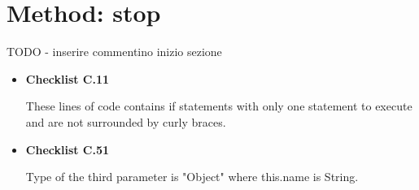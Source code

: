 \documentclass[../../../../dd.tex]{subfiles}
\begin{document}
	\section{Method: stop}

		TODO - inserire commentino inizio sezione

		\begin{itemize}

			\item \textbf{Checklist C.11}

				  

				  These lines of code contains if statements with only one statement to execute and are not surrounded by curly braces.

			\item \textbf{Checklist C.51}

				  

				  Type of the third parameter is "Object" where this.name is String.
				  
		\end{itemize}
\end{document}
